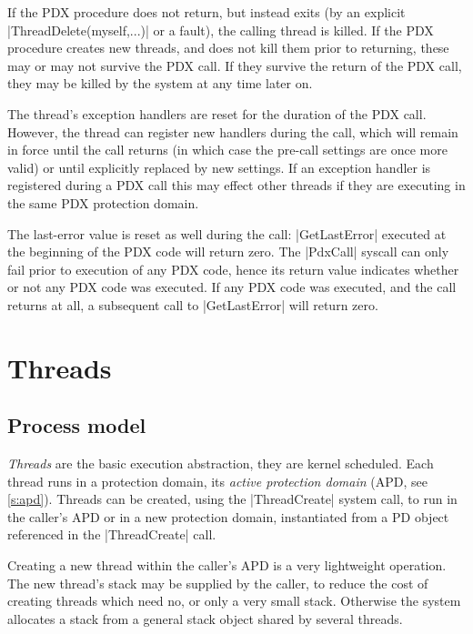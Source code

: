 \documentclass[a4paper,11pt,twoside,dvips]{report}
\begin{document}
\begin{description}
If the PDX procedure does not return, but instead exits (by an explicit
|ThreadDelete(myself,...)| or a fault), the calling thread is killed. If
the PDX procedure creates new threads, and does not kill them prior to
returning, these may or may not survive the PDX call. If they survive
the return of the PDX call, they may be killed by the system at any time
later on.


The thread's exception handlers are reset for the duration of the PDX
call. However, the thread can register new handlers during the call,
which will remain in force until the call returns (in which case the
pre-call settings are once more valid) or until explicitly replaced by
new settings. If an exception handler is registered during a PDX call
this may effect other threads if they are executing in the same PDX
protection domain.

The last-error value is reset as well during the call: |GetLastError|
executed at the beginning of the PDX code will return zero. The
|PdxCall| syscall can only fail prior to execution of any PDX code,
hence its return value indicates whether or not any PDX code was
executed. If any PDX code was executed, and the call returns at all, a
subsequent call to |GetLastError| will return zero.

\end{description}



\chapter{\label{s:thread}Threads}

\section{\label{s:proc-mod}Process model}



\emph{Threads} are the basic execution abstraction, they are kernel
scheduled. Each thread runs in a protection domain, its \emph{active
protection domain} (APD, see \autoref{s:apd}). Threads can be
created, using the |ThreadCreate| system call, to run in the caller's APD
or in a new protection domain, instantiated from a PD object referenced
in the |ThreadCreate| call.

Creating a new thread within the caller's APD is a very lightweight
operation. The new thread's stack may be supplied by the caller, to
reduce the cost of creating threads which need no, or only a very small
stack. Otherwise the system allocates a stack from a general stack
object shared by several threads.
\end{document}
